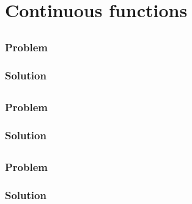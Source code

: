 \setcounter{section}{17} %
\section{Continuous functions}
\label{sec-topspace-continuous}


\setcounter{subsection}{0} %
\subsection{}

\subsubsection{Problem}

\subsubsection{Solution}


\setcounter{subsection}{1} %
\subsection{}

\subsubsection{Problem}

\subsubsection{Solution}


\setcounter{subsection}{2} %
\subsection{}

\subsubsection{Problem}

\subsubsection{Solution}

